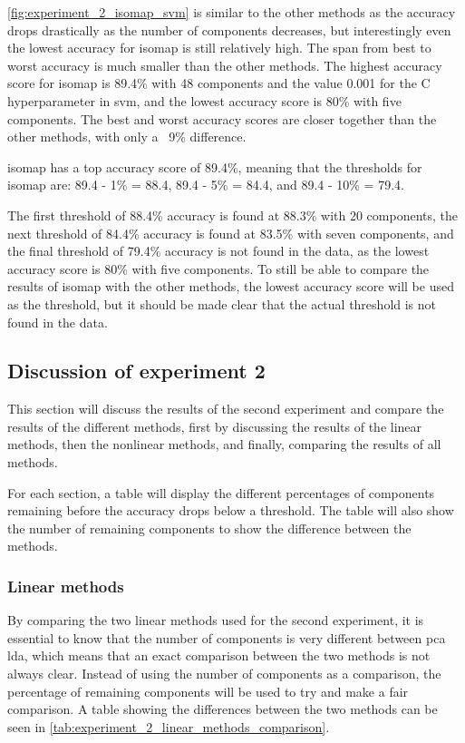 \autoref{fig:experiment_2_isomap_svm} is similar to the other methods as the accuracy drops drastically as the number of components decreases, but interestingly even the lowest accuracy for \gls{isomap} is still relatively high. The span from best to worst accuracy is much smaller than the other methods. The highest accuracy score for \gls{isomap} is 89.4\% with 48 components and the value 0.001 for the C hyperparameter in \gls{svm}, and the lowest accuracy score is 80\% with five components. The best and worst accuracy scores are closer together than the other methods, with only a ~9\% difference.

isomap has a top accuracy score of 89.4\%, meaning that the thresholds for \gls{isomap}  are: 89.4 - 1\% = 88.4, 89.4 - 5\% = 84.4, and 89.4 - 10\% = 79.4. 

The first threshold of 88.4\% accuracy is found at 88.3\% with 20 components, the next threshold of 84.4\% accuracy is found at 83.5\% with seven components, and the final threshold of 79.4\% accuracy is not found in the data, as the lowest accuracy score is 80\% with five components. To still be able to compare the results of \gls{isomap}  with the other methods, the lowest accuracy score will be used as the threshold, but it should be made clear that the actual threshold is not found in the data.


\subsection{Discussion of experiment 2}\label{subsec:experiment_2_discussion}
This section will discuss the results of the second experiment and compare the results of the different methods, first by discussing the results of the linear methods, then the nonlinear methods, and finally, comparing the results of all methods.

For each section, a table will display the different percentages of components remaining before the accuracy drops below a threshold. The table will also show the number of remaining components to show the difference between the methods.


\subsubsection{Linear methods}
By comparing the two linear methods used for the second experiment, it is essential to know that the number of components is very different between \gls{pca} \gls{lda}, which means that an exact comparison between the two methods is not always clear. Instead of using the number of components as a comparison, the percentage of remaining components will be used to try and make a fair comparison. A table showing the differences between the two methods can be seen in \autoref{tab:experiment_2_linear_methods_comparison}.

